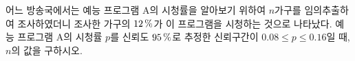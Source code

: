 어느 방송국에서는 예능 프로그램 $\mathrm{A}$의 시청률을 알아보기 위하여 $n$가구를 임의추출하여 조사하였더니 조사한 가구의 $12\mkern3mu \%$가 이 프로그램을 시청하는 것으로 나타났다. 예능 프로그램 $\mathrm{A}$의 시청률 $p$를 신뢰도 $95\mkern3mu \%$로 추정한 신뢰구간이 $0.08\le p\le 0.16$일 때, $n$의 값을 구하시오. 
